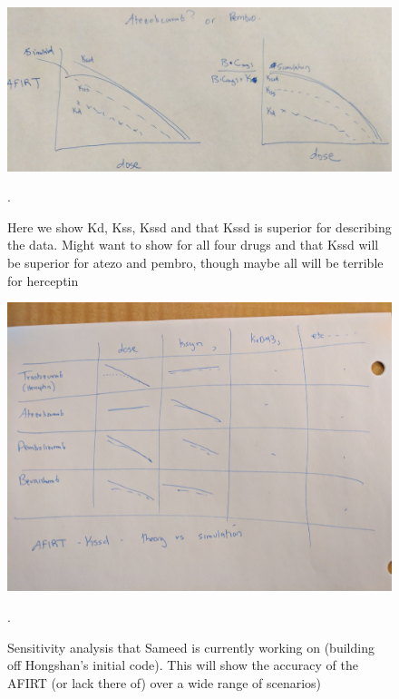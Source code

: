 \begin{figure}[H]
\centering
\includegraphics[width=\textwidth]{figures/Kssd_Kss_Kd.jpg}
\caption{Here we show Kd, Kss, Kssd and that Kssd is superior for describing the data.  Might want to show for all four drugs and that Kssd will be superior for atezo and pembro, though maybe all will be terrible for herceptin
\label{fig:Kssd}}.
\end{figure}

\begin{figure}[H]
\centering
\includegraphics[width=\textwidth]{figures/SensitivityAnalysis.jpg}
\caption{Sensitivity analysis that Sameed is currently working on (building off Hongshan's initial code).  This will show the accuracy of the AFIRT (or lack there of) over a wide range of scenarios)
\label{fig:sensitivity}}.
\end{figure}

